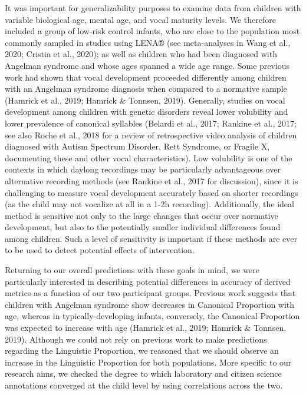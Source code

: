 \documentclass[english,,man]{apa6}
\begin{document}
It was important for generalizability purposes to examine data from children with variable biological age, mental age, and vocal maturity levels. We therefore included a group of low-risk control infants, who are close to the population most commonly sampled in studies using LENA® (see meta-analyses in Wang et al., 2020; Cristia et al., 2020); as well as children who had been diagnosed with Angelman syndrome and whose ages spanned a wide age range. Some previous work had shown that vocal development proceeded differently among children with an Angelman syndrome diagnosis when compared to a normative sample (Hamrick et al., 2019; Hamrick \& Tonnsen, 2019). Generally, studies on vocal development among children with genetic disorders reveal lower volubility and lower prevalence of canonical syllables (Belardi et al., 2017; Rankine et al., 2017; see also Roche et al., 2018 for a review of retrospective video analysis of children diagnosed with Autism Spectrum Disorder, Rett Syndrome, or Fragile X, documenting these and other vocal characteristics). Low volubility is one of the contexts in which daylong recordings may be particularly advantageous over alternative recording methods (see Rankine et al., 2017 for discussion), since it is challenging to measure vocal development accurately based on shorter recordings (as the child may not vocalize at all in a 1-2h recording). Additionally, the ideal method is sensitive not only to the large changes that occur over normative development, but also to the potentially smaller individual differences found among children. Such a level of sensitivity is important if these methods are ever to be used to detect potential effects of intervention.

Returning to our overall predictions with these goals in mind, we were particularly interested in describing potential differences in accuracy of derived metrics as a function of our two participant groups. Previous work suggests that children with Angelman syndrome show decreases in Canonical Proportion with age, whereas in typically-developing infants, conversely, the Canonical Proportion was expected to increase with age (Hamrick et al., 2019; Hamrick \& Tonnsen, 2019). Although we could not rely on previous work to make predictions regarding the Linguistic Proportion, we reasoned that we should observe an increase in the Linguistic Proportion for both populations. More specific to our research aims, we checked the degree to which laboratory and citizen science annotations converged at the child level by using correlations across the two.
\end{document}
